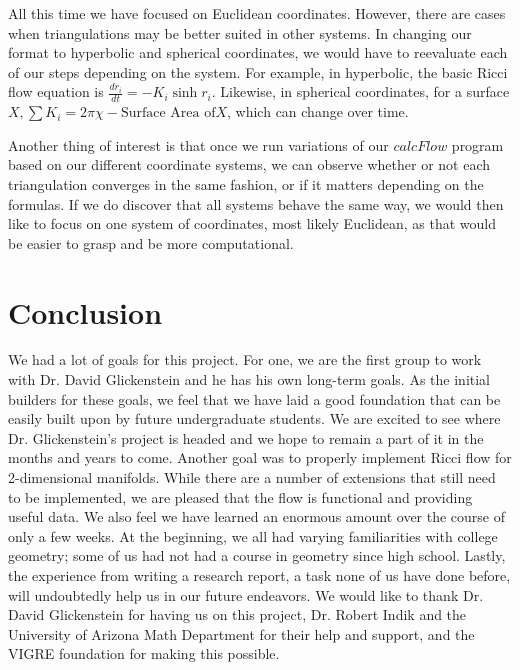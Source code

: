 \documentclass[12pt]{article}
\begin{document}
All this time we have focused on Euclidean coordinates. However, there are cases when triangulations may be better suited in other systems. In changing our format to hyperbolic and spherical coordinates, we would have to reevaluate each of our steps depending on the system. For example, in hyperbolic, the basic Ricci flow equation is $\displaystyle \frac{dr_i}{dt} = -K_i\sinh r_i$. Likewise, in spherical coordinates, for a surface $X, \displaystyle \sum{K_i} = 2\pi\chi - \mbox{Surface Area of} X$, which can change over time. \newline

\noindent Another thing of interest is that once we run variations of our $calcFlow$ program based on our different coordinate systems, we can observe whether or not each triangulation converges in the same fashion, or if it matters depending on the formulas. If we do discover that all systems behave the same way, we would then like to focus on one system of coordinates, most likely Euclidean, as that would be easier to grasp and be more computational. 

\section{Conclusion}

We had a lot of goals for this project. For one, we are the first group to work with Dr. David Glickenstein and he has his own long-term goals. As the initial builders for these goals, we feel that we have laid a good foundation that can be easily built upon by future undergraduate students. We are excited to see where Dr. Glickenstein's project is headed and we hope to remain a part of it in the months and years to come. Another goal was to properly implement Ricci flow for 2-dimensional manifolds. While there are a number of extensions that still need to be implemented, we are pleased that the flow is functional and providing useful data. We also feel we have learned an enormous amount over the course of only a few weeks. At the beginning, we all had varying familiarities with college geometry; some of us had not had a course in geometry since high school. Lastly, the experience from writing a research report, a task none of us have done before, will undoubtedly help us in our future endeavors. We would like to thank Dr. David Glickenstein for having us on this project, Dr. Robert Indik and the University of Arizona Math Department for their help and support, and the VIGRE foundation for making this possible.
  
\end{document}
